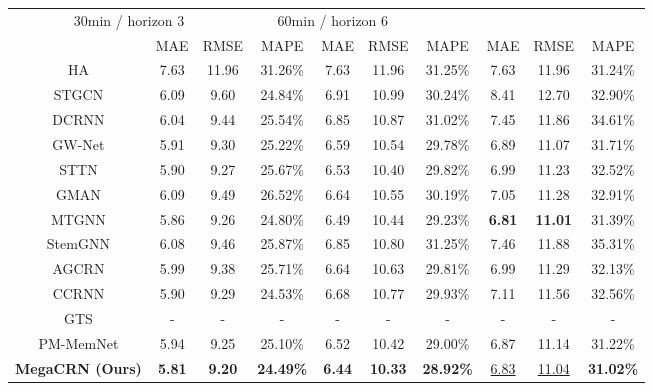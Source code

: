 \documentclass[letterpaper]{article} \usepackage{aaai23}  \usepackage{times}  \usepackage{helvet}  \usepackage{courier}  \usepackage[hyphens]{url}  \usepackage{graphicx} \urlstyle{rm} \def\UrlFont{\rm}  \usepackage{natbib}  \usepackage{caption} \usepackage{multirow}
\begin{document}
\begin{table*}[h]
{\begin{tabular*}{17.6cm}{@{\extracolsep{\fill}}cccccccccc}
		\multicolumn{3}{c}{30min / horizon 3} &
		\multicolumn{3}{c}{60min / horizon 6} \\
		\cline{2-4} \cline{5-7} \cline{8-10}
		\multicolumn{1}{l}{} & 
		\multicolumn{1}{c}{MAE} & 
		\multicolumn{1}{c}{RMSE} &
		\multicolumn{1}{c}{MAPE} &
		\multicolumn{1}{c}{MAE} & 
		\multicolumn{1}{c}{RMSE} &
		\multicolumn{1}{c}{MAPE} &
		\multicolumn{1}{c}{MAE} & 
		\multicolumn{1}{c}{RMSE} &
		\multicolumn{1}{c}{MAPE} \\
		\hline
		HA\cite{li2018diffusion} & 7.63 & 11.96 & 31.26\% & 7.63 & 11.96 & 31.25\% & 7.63 & 11.96 & 31.24\% \\
		STGCN\cite{yu2018spatio} & 6.09 & 9.60 & 24.84\% & 6.91 & 10.99 & 30.24\% & 8.41 & 12.70 & 32.90\%\\
		DCRNN\cite{li2018diffusion} & 6.04 & 9.44 & 25.54\% & 6.85 & 10.87 & 31.02\% & 7.45 & 11.86 & 34.61\%\\
		GW-Net\cite{wu2019graph} & 5.91 & 9.30 & 25.22\% & 6.59 & 10.54 & 29.78\% & 6.89 & 11.07 & 31.71\% \\
		STTN\cite{xu2020spatial} & 5.90 & 9.27 & 25.67\% & 6.53 & 10.40 & 29.82\% & 6.99 & 11.23 & 32.52\%\\
		GMAN\cite{zheng2020gman} & 6.09 & 9.49 & 26.52\% & 6.64 & 10.55 & 30.19\% & 7.05 & 11.28 & 32.91\%\\
		MTGNN\cite{wu2020connecting} & 5.86 & 9.26 & 24.80\% & 6.49 & 10.44 & 29.23\% & \textbf{6.81} & \textbf{11.01} & 31.39\% \\
		StemGNN\cite{cao2020spectral} & 6.08 & 9.46 & 25.87\% & 6.85 & 10.80 & 31.25\% & 7.46 & 11.88 & 35.31\%\\
		AGCRN\cite{bai2020adaptive} & 5.99 & 9.38 & 25.71\% & 6.64 & 10.63 & 29.81\% & 6.99 & 11.29 & 32.13\% \\
		CCRNN\cite{ye2021coupled} & 5.90 & 9.29 & 24.53\% & 6.68 & 10.77 & 29.93\% & 7.11 & 11.56 & 32.56\%\\
GTS\cite{shang2021discrete} & - & - & - & - & - & - & - & - & - \\
		PM-MemNet\cite{lee2021learning} & 5.94 & 9.25 & 25.10\% & 6.52 & 10.42 & 29.00\% & 6.87 & 11.14 & 31.22\% \\
\textbf{MegaCRN (Ours)} & \textbf{5.81} & \textbf{9.20} & \textbf{24.49\%} & \textbf{6.44} & \textbf{10.33} & \textbf{28.92\%} & \underline{6.83} & \underline{11.04} & \textbf{31.02\%} \\
		\hline
	\end{tabular*}
	}
	\centering
\end{table*}
\end{document}
